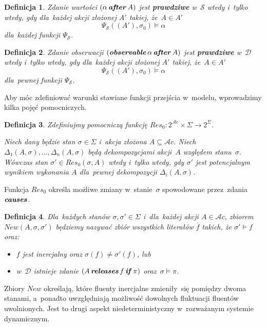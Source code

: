 \documentclass[11pt,a4paper]{article}
\newtheorem{defn}{Definicja}
\DeclareMathOperator{\After}{\textbf{\textit{after}}}
\DeclareMathOperator{\Observable}{\textbf{\textit{observable}}}
\DeclareMathOperator{\Causes}{\textbf{\textit{causes}}}
\DeclareMathOperator{\If}{\textbf{\textit{if}}}
\DeclareMathOperator{\Releases}{\textbf{\textit{releases}}}
\begin{document}
\begin{defn}
    Zdanie wartości $(\alpha \After A)$ jest \textbf{prawdziwe} w~$\mathcal{S}$ wtedy i~tylko wtedy, gdy dla~każdej akcji złożonej $A'$ takiej, że~$A \in A'$
    $$\Psi_{\mathcal{S}}((A'), \sigma_0) \models \alpha$$
    dla~każdej funkcji $\Psi_{\mathcal{S}}$.
\end{defn}

\begin{defn}
    Zdanie obserwacji $(\Observable \alpha \After A)$ jest \textbf{prawdziwe} w~$\mathcal{D}$ wtedy i~tylko wtedy, gdy dla~każdej akcji złożonej $A'$ takiej, że~$A \in A'$
    $$\Psi_{\mathcal{S}}((A'), \sigma_0) \models \alpha$$
    dla~pewnej funkcji $\Psi_{\mathcal{S}}$.
\end{defn}

Aby móc zdefiniować warunki stawiane funkcji przejścia w~modelu, wprowadzimy kilka pojęć pomocniczych.

\begin{defn}
    Zdefiniujmy pomocniczą funkcję $Res_0: 2^{\mathcal{A}c} \times \Sigma \rightarrow 2^\Sigma$.

    Niech dany będzie stan $\sigma \in \Sigma$ i~akcja złożona $A \subseteq \mathcal{A}c$.
    Niech $\Delta_1(A, \sigma), \dots, \Delta_n(A, \sigma)$ będą dekompozycjami akcji~$A$ względem stanu~$\sigma$.
    Wówczas stan $\sigma' \in Res_0(\sigma, A)$ wtedy i~tylko wtedy, gdy $\sigma'$ jest potencjalnym wynikiem wykonania $A$ dla~pewnej dekompozycji $\Delta_i(A, \sigma)$.
\end{defn}

Funkcja $Res_0$ określa możliwe zmiany w~stanie~$\sigma$ spowodowane przez~zdania $\Causes$.

\begin{defn}
    Dla~każdych stanów $\sigma, \sigma' \in \Sigma$ i~dla~każdej akcji $A \in \mathcal{A}c$, zbiorem $New(A, \sigma, \sigma')$ będziemy nazywać zbiór wszystkich literałów $\overline{f}$ takich, że $\sigma' \models f$ oraz:
    \begin{itemize}
        \item $f$ jest inercjalny oraz $\sigma(f) \neq \sigma'(f)$, lub
        \item w~$\mathcal{D}$ istnieje zdanie $(A \Releases f \If \pi)$ oraz~$\sigma \models \pi$.
    \end{itemize}
\end{defn}

Zbiory $New$ określają, które fluenty inercjalne zmieniły~się pomiędzy dwoma stanami, a~ponadto uwzględniają możliwość dowolnych fluktuacji fluentów uwolnionych.
Jest to drugi aspekt niedeterministyczny w~rozważanym systemie dynamicznym.
\end{document}
